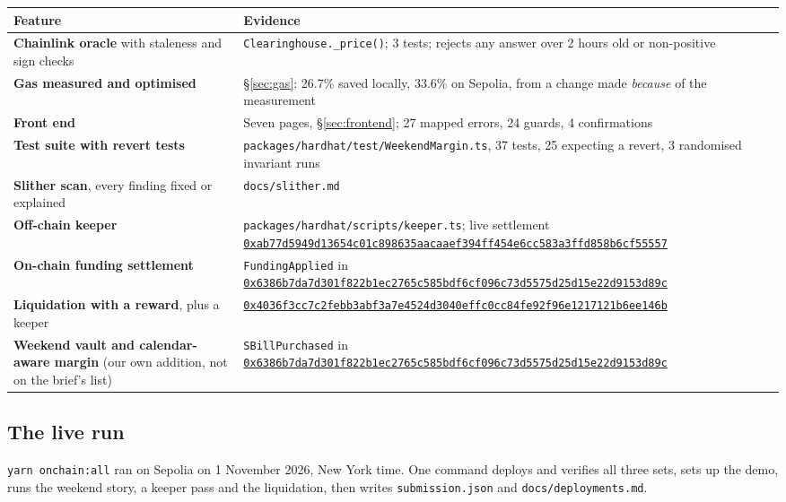 \documentclass[11pt,a4paper]{article}
\newcommand{\note}[1]{{\small\color{muted}#1}}
\newcommand{\etx}[1]{{\footnotesize\href{https://sepolia.etherscan.io/tx/#1}{\nolinkurl{#1}}}}
\begin{document}
\begin{center}
\small
\begin{tabular}{@{}p{5.6cm}p{9.8cm}@{}}
\toprule
\textbf{Feature} & \textbf{Evidence} \\
\midrule
\textbf{Chainlink oracle} with staleness and sign checks & \texttt{Clearinghouse.\_price()}; 3 tests; rejects any answer over 2 hours old or non-positive \\
\textbf{Gas measured and optimised} & \S\ref{sec:gas}: 26.7\% saved locally, 33.6\% on Sepolia, from a change made \emph{because} of the measurement \\
\textbf{Front end} & Seven pages, \S\ref{sec:frontend}; 27 mapped errors, 24 guards, 4 confirmations \\
\textbf{Test suite with revert tests} & \texttt{packages/hardhat/test/WeekendMargin.ts}, 37 tests, 25 expecting a revert, 3 randomised invariant runs \\
\textbf{Slither scan}, every finding fixed or explained & \texttt{docs/slither.md} \\
\textbf{Off-chain keeper} & \texttt{packages/hardhat/scripts/keeper.ts}; live settlement \etx{0xab77d5949d13654c01c898635aacaaef394ff454e6cc583a3ffd858b6cf55557} \\
\textbf{On-chain funding settlement} & \texttt{FundingApplied} in \etx{0x6386b7da7d301f822b1ec2765c585bdf6cf096c73d5575d25d15e22d9153d89c} \\
\textbf{Liquidation with a reward}, plus a keeper & \etx{0x4036f3cc7c2febb3abf3a7e4524d3040effc0cc84fe92f96e1217121b6ee146b} \\
\textbf{Weekend vault and calendar-aware margin} \note{(our own addition, not on the brief's list)} & \texttt{SBillPurchased} in \etx{0x6386b7da7d301f822b1ec2765c585bdf6cf096c73d5575d25d15e22d9153d89c} \\
\bottomrule
\end{tabular}
\end{center}

\subsection{The live run}\label{sec:liverun}

\texttt{yarn onchain:all} ran on Sepolia on 1 November 2026, New York time. One command deploys and
verifies all three sets, sets up the demo, runs the weekend story, a keeper pass and the liquidation,
then writes \texttt{submission.json} and \texttt{docs/deployments.md}.
\end{document}
